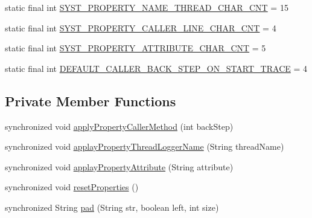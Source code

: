 \begin{DoxyCompactItemize}
\item 
static final int \hyperlink{classit_1_1emarolab_1_1cagg_1_1debugging_1_1DebuggingText_1_1Log4j_a53465d4b2b9ad8420c3b3308242e2089}{S\-Y\-S\-T\-\_\-\-P\-R\-O\-P\-E\-R\-T\-Y\-\_\-\-N\-A\-M\-E\-\_\-\-T\-H\-R\-E\-A\-D\-\_\-\-C\-H\-A\-R\-\_\-\-C\-N\-T} = 15
\item 
static final int \hyperlink{classit_1_1emarolab_1_1cagg_1_1debugging_1_1DebuggingText_1_1Log4j_a64e6a91eb91ad47aea6c35347c1d6da3}{S\-Y\-S\-T\-\_\-\-P\-R\-O\-P\-E\-R\-T\-Y\-\_\-\-C\-A\-L\-L\-E\-R\-\_\-\-L\-I\-N\-E\-\_\-\-C\-H\-A\-R\-\_\-\-C\-N\-T} = 4
\item 
static final int \hyperlink{classit_1_1emarolab_1_1cagg_1_1debugging_1_1DebuggingText_1_1Log4j_a3b120d0d69a1d5039ca09dd422fd007a}{S\-Y\-S\-T\-\_\-\-P\-R\-O\-P\-E\-R\-T\-Y\-\_\-\-A\-T\-T\-R\-I\-B\-U\-T\-E\-\_\-\-C\-H\-A\-R\-\_\-\-C\-N\-T} = 5
\item 
static final int \hyperlink{classit_1_1emarolab_1_1cagg_1_1debugging_1_1DebuggingText_1_1Log4j_ad1eed4db73eb6e5a98314374983835d9}{D\-E\-F\-A\-U\-L\-T\-\_\-\-C\-A\-L\-L\-E\-R\-\_\-\-B\-A\-C\-K\-\_\-\-S\-T\-E\-P\-\_\-\-O\-N\-\_\-\-S\-T\-A\-R\-T\-\_\-\-T\-R\-A\-C\-E} = 4
\end{DoxyCompactItemize}
\subsection*{Private Member Functions}
\begin{DoxyCompactItemize}
\item 
synchronized void \hyperlink{classit_1_1emarolab_1_1cagg_1_1debugging_1_1DebuggingText_1_1Log4j_a2401d6c8ef1312e54a3483d09b24baf4}{apply\-Property\-Caller\-Method} (int back\-Step)
\item 
synchronized void \hyperlink{classit_1_1emarolab_1_1cagg_1_1debugging_1_1DebuggingText_1_1Log4j_a4e5a552697d1d7adb5816f4683387917}{applay\-Property\-Thread\-Logger\-Name} (String thread\-Name)
\item 
synchronized void \hyperlink{classit_1_1emarolab_1_1cagg_1_1debugging_1_1DebuggingText_1_1Log4j_a0a05f20d19cbd4a5ae586a6eeb02edff}{applay\-Property\-Attribute} (String attribute)
\item 
synchronized void \hyperlink{classit_1_1emarolab_1_1cagg_1_1debugging_1_1DebuggingText_1_1Log4j_abcc007e4a0e7242d76ecea6a42e6ae6f}{reset\-Properties} ()
\item 
synchronized String \hyperlink{classit_1_1emarolab_1_1cagg_1_1debugging_1_1DebuggingText_1_1Log4j_a50f3cb578d65949df1dfbe30027864a5}{pad} (String str, boolean left, int size)
\end{DoxyCompactItemize}
